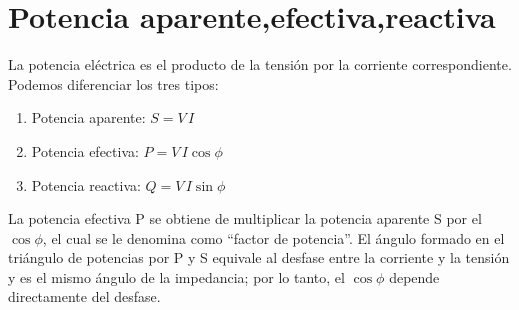 \documentclass[a4paper,12pt]{report}
\begin{document}
\chapter{Potencia aparente,efectiva,reactiva}
La potencia eléctrica es el producto de la tensión por la corriente correspondiente. Podemos diferenciar los tres tipos:
\begin{enumerate}
\item Potencia aparente: $S = V\,I$
\item Potencia efectiva: $P = V\,I\cos \phi$
\item Potencia reactiva: $Q = V\,I\sin \phi$
\end{enumerate}
La potencia efectiva P se obtiene de multiplicar la potencia aparente S por el $\cos\phi$, el cual se le denomina como ``factor de potencia''. El ángulo formado en el triángulo de potencias por P y S equivale al desfase entre la corriente y la tensión y es el mismo ángulo de la impedancia; por lo tanto, el $\cos\phi$ depende directamente del desfase.
\end{document}

